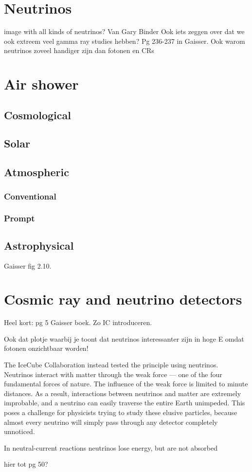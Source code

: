 \section{Neutrinos}
image with all kinds of neutrinos? Van Gary Binder
Ook iets zeggen over dat we ook extreem veel gamma ray studies hebben? Pg 236-237 in Gaisser.
Ook warom neutrinos zoveel handiger zijn dan fotonen en CRs
\section{Air shower}
\subsection{Cosmological}
\subsection{Solar}
\subsection{Atmospheric}
\subsubsection{Conventional}
\subsubsection{Prompt}
\subsection{Astrophysical}
Gaisser fig 2.10.
\section{Cosmic ray and neutrino detectors}
Heel kort: pg 5 Gaisser boek. Zo IC introduceren.

Ook dat plotje waarbij je toont dat neutrinos interessanter zijn in hoge E omdat fotonen onzichtbaar worden!

The IceCube Collaboration instead tested the principle using neutrinos. Neutrinos interact with matter through the weak force — one of the four fundamental forces of nature. The influence of the weak force is limited to minute distances. As a result, interactions between neutrinos and matter are extremely improbable, and a neutrino can easily traverse the entire Earth unimpeded. This poses a challenge for physicists trying to study these elusive particles, because almost every neutrino will simply pass through any detector completely unnoticed.




In neutral-current reactions neutrinos lose energy, but are not absorbed

hier tot pg 50?